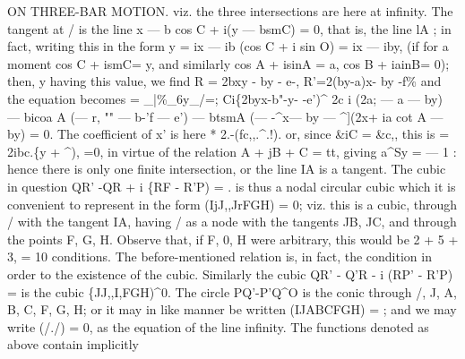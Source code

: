 \documentclass[12pt,a4paper]{article}
\begin{document}
ON THREE-BAR MOTION.
viz.
the
three
intersections
are
here
at
infinity.
The
tangent
at
/
is
the
line
x --- b cos C + i(y --- bsmC) = 0, that
is, the
line lA
;
in
fact, writing
this
in the
form
y = ix --- ib (cos C + i sin O) = ix --- iby,
(if
for a moment
cos C + ismC= y, and
similarly
cos A + isinA = a,
cos B + iainB= 0);
then, y
having
this
value, we
find
R = 2bxy - by - e-, R'=2(by-a)x- by -f\%
and
the equation becomes
= \_|\%\_6y\_/=;
Ci\{2byx-b"-y- -e')\textasciicircum{}
2c
i (2a; --- a --- by)
--- bicoa A (---
r,
"" --- b-'f --- e')
--- btsmA (--- -\textasciicircum{}x--- by --- \textasciicircum{}](2x+ ia cot A --- by) = 0.
The
coefficient of x'
is here
*
2.-(fc,,.\textasciicircum{}.!).
or, since
\&iC = \&c,,
this
is
= 2ibc.\{y + \textasciicircum{}),
=0,
in
virtue
of
the
relation A + jB + C = tt,
giving
a\textasciicircum{}Sy = --- 1
:
hence
there
is
only
one
finite
intersection, or the
line IA
is a tangent.
The cubic
in question
QR' -QR + i \{RF - R'P) =
.
is thus a nodal
circular cubic which
it
is convenient
to represent
in the form
(IjJ,,JrFGH) = 0;
viz.
this
is
a
cubic,
through /
with
the
tangent IA, having /
as
a
node
with
the
tangents
JB,
JC,
and
through
the
points
F,
G,
H.
Observe
that,
if
F,
0, H
were
arbitrary,
this
would
be
2 + 5 + 3, = 10 conditions.
The before-mentioned
relation
is, in
fact, the condition
in order
to the existence of the
cubic.
Similarly the cubic
QR' - Q'R - i (RP' - R'P) =
is the cubic
\{JJ,,I,FGH)\textasciicircum{}0.
The
circle PQ'-P'Q\textasciicircum{}O
is
the
conic
through
/,
J,
A,
B,
C,
F,
G, H;
or
it may
in
like
manner
be
written (IJABCFGH) =
;
and
we
may
write
(/./) = 0,
as
the
equation
of
the
line
infinity.
The
functions
denoted
as
above
contain
implicitly
\end{document}
